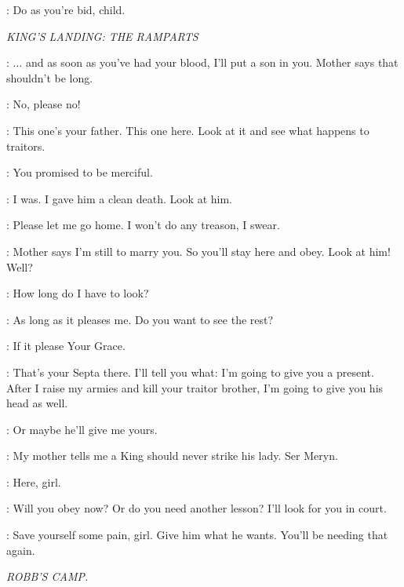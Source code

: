 \HOUND: Do as you're bid, child. 


\scene

\textit{KING'S LANDING: THE RAMPARTS} 


\JOFFREY: $\ldots$ and as soon as you've had your blood, I'll put a son in you. Mother says that shouldn't be long. 

\SANSA:  No, please no! 

\JOFFREY: This one's your father. This one here. Look at it and see what happens to traitors. 

\SANSA: You promised to be merciful. 

\JOFFREY: I was. I gave him a clean death. Look at him. 

\SANSA: Please let me go home. I won't do any treason, I swear. 

\JOFFREY: Mother says I'm still to marry you. So you'll stay here and obey. Look at him! Well? 

\SANSA: How long do I have to look? 

\JOFFREY: As long as it pleases me. Do you want to see the rest? 

\SANSA: If it please Your Grace. 

\JOFFREY: That's your Septa there. I'll tell you what: I'm going to give you a present. After I raise my armies and kill your traitor brother, I'm going to give you his head as well. 

\SANSA: Or maybe he'll give me yours. 

\JOFFREY: My mother tells me a King should never strike his lady. Ser Meryn. 


\HOUND: Here, girl. 

\JOFFREY: Will you obey now? Or do you need another lesson? I'll look for you in court. 

\HOUND: Save yourself some pain, girl. Give him what he wants.  You'll be needing that again. 


\scene

\textit{ROBB'S CAMP.}

